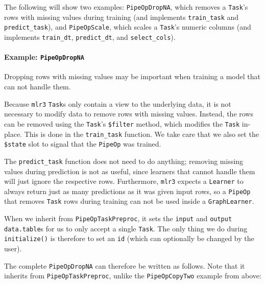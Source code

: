 \documentclass[]{article}
\let\oldparagraph\paragraph
\renewcommand{\paragraph}[1]{\oldparagraph{#1}\mbox{}}
\begin{document}
The following will show two examples: \texttt{PipeOpDropNA}, which removes a \texttt{Task}'s rows with missing values during training (and implements \texttt{train\_task} and \texttt{predict\_task}), and \texttt{PipeOpScale}, which scales a \texttt{Task}'s numeric columns (and implements \texttt{train\_dt}, \texttt{predict\_dt}, and \texttt{select\_cols}).

\hypertarget{example-pipeopdropna}{%
\paragraph{\texorpdfstring{Example: \texttt{PipeOpDropNA}}{Example: PipeOpDropNA}}\label{example-pipeopdropna}}

Dropping rows with missing values may be important when training a model that can not handle them.

Because \texttt{mlr3} \texttt{Task}s only contain a view to the underlying data, it is not necessary to modify data to remove rows with missing values.
Instead, the rows can be removed using the \texttt{Task}'s \texttt{\$filter} method, which modifies the \texttt{Task} in-place.
This is done in the \texttt{train\_task} function. We take care that we also set the \texttt{\$state} slot to signal that the \texttt{PipeOp} was trained.

The \texttt{predict\_task} function does not need to do anything; removing missing values during prediction is not as useful, since learners that cannot handle them will just ignore the respective rows.
Furthermore, \texttt{mlr3} expects a \texttt{Learner} to always return just as many predictions as it was given input rows, so a \texttt{PipeOp} that removes \texttt{Task} rows during training can not be used inside a \texttt{GraphLearner}.

When we inherit from \texttt{PipeOpTaskPreproc}, it sets the \texttt{input} and \texttt{output} \texttt{data.table}s for us to only accept a single \texttt{Task}.
The only thing we do during \texttt{initialize()} is therefore to set an \texttt{id} (which can optionally be changed by the user).

The complete \texttt{PipeOpDropNA} can therefore be written as follows.
Note that it inherits from \texttt{PipeOpTaskPreproc}, unlike the \texttt{PipeOpCopyTwo} example from above:
\end{document}
